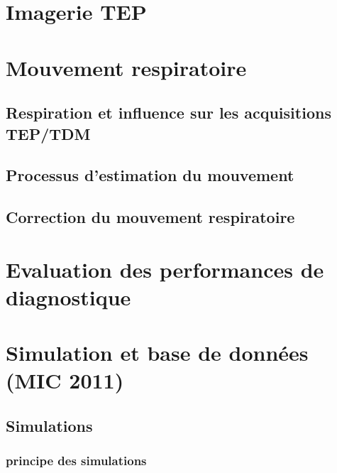 \documentclass[12pt]{book}
\begin{document}
\part{Imagerie TEP}
		
			

\part{Mouvement respiratoire}
%	

	\chapter{Respiration et influence sur les acquisitions TEP/TDM}
	
	
	\chapter{Processus d'estimation du mouvement}
	
	
	\chapter{Correction du mouvement respiratoire}
	

\part{Evaluation des performances de diagnostique}
	



\part{Simulation et base de données (MIC 2011)}
	\chapter{Simulations}
		\section{principe des simulations}
\end{document}
